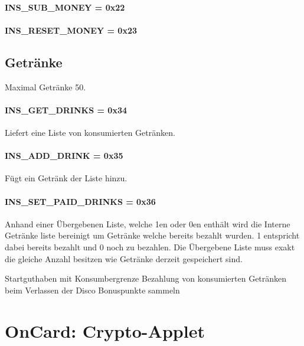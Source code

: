 \paragraph{INS\_SUB\_MONEY = 0x22}
\paragraph{INS\_RESET\_MONEY = 0x23}

\subsection{Getränke}
Maximal Getränke 50.
	
\paragraph{INS\_GET\_DRINKS = 0x34}
Liefert eine Liste von konsumierten Getränken.
\paragraph{INS\_ADD\_DRINK = 0x35}
Fügt ein Getränk der Liste hinzu.
\paragraph{INS\_SET\_PAID\_DRINKS = 0x36}
Anhand einer Übergebenen Liste, welche 1en oder 0en enthält wird die Interne Getränke liste bereinigt um Getränke welche bereits bezahlt wurden.
1 entspricht dabei bereits bezahlt und 0 noch zu bezahlen.
Die Übergebene Liste muss exakt die gleiche Anzahl besitzen wie Getränke derzeit gespeichert sind.

Startguthaben mit Konsumbergrenze
Bezahlung von konsumierten Getränken beim Verlassen der Disco
Bonuspunkte sammeln

\section{OnCard: Crypto-Applet}


